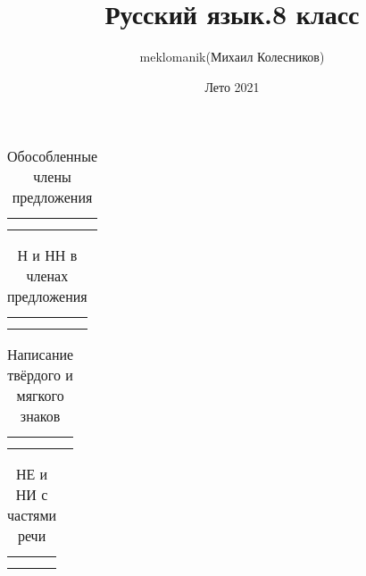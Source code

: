 \documentclass[a4paper, 12pt]{article}
\begin{document}
    \title{Русский язык.8 класс}
    \author{meklomanik(Михаил Колесников)}
    \date{Лето 2021}
    \maketitle \clearpage\tableofcontents \clearpage
    \begin{table}[]
        \centering
        \begin{tabular}{c|c}
             &  \\
             & 
        \end{tabular}
        \caption{Обособленные члены предложения}
    \end{table}
    \begin{table}[]
        \centering
        \begin{tabular}{c|c}
             &  \\
             & 
        \end{tabular}
        \caption{Н и НН в членах предложения}
    \end{table}
    \begin{table}[]
        \centering
        \begin{tabular}{c|c}
             &  \\
             & 
        \end{tabular}
        \caption{Написание твёрдого и мягкого знаков}
    \end{table}
    \begin{table}[]
        \centering
        \begin{tabular}{c|c}
             &  \\
             & 
        \end{tabular}
        \caption{НЕ и НИ с частями речи}
    \end{table}
\end{document}
